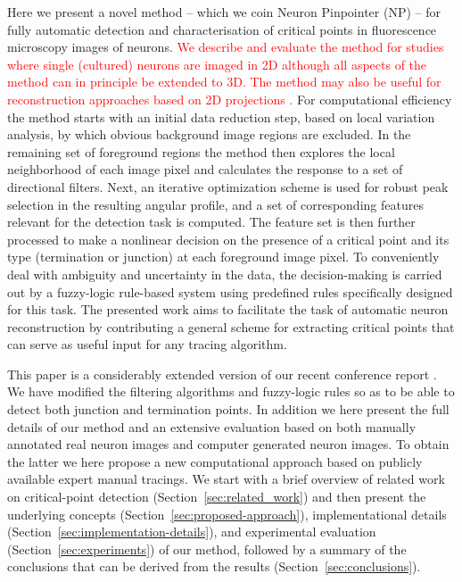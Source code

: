 \documentclass[twocolumn,natbib]{svjour3}
\newcommand{\marked}[1]{\textcolor{red}{#1}}
\begin{document}
Here we present a novel method -- which we coin Neuron Pinpointer (NP) -- for fully automatic detection and characterisation of critical points in fluorescence microscopy images of neurons. \marked{We describe and evaluate the method for studies where single (cultured) neurons are imaged in 2D although all aspects of the method can in principle be extended to 3D. The method may also be useful for reconstruction approaches based on 2D projections \citep{Zhou-2015}.} For computational efficiency the method starts with an initial data reduction step, based on local variation analysis, by which obvious background image regions are excluded. In the remaining set of foreground regions the method then explores the local neighborhood of each image pixel and calculates the response to a set of directional filters. Next, an iterative optimization scheme is used for robust peak selection in the resulting angular profile, and a set of corresponding features relevant for the detection task is computed. The feature set is then further processed to make a nonlinear decision on the presence of a critical point and its type (termination or junction) at each foreground image pixel. To conveniently deal with ambiguity and uncertainty in the data, the decision-making is carried out by a fuzzy-logic rule-based system using predefined rules specifically designed for this task. The presented work aims to facilitate the task of automatic neuron reconstruction by contributing a general scheme for extracting critical points that can serve as useful input for any tracing algorithm.

This paper is a considerably extended version of our recent conference report \citep{radojevic2014fuzzy}. We have modified the filtering algorithms and fuzzy-logic rules so as to be able to detect both junction and termination points. In addition we here present the full details of our method and an extensive evaluation based on both manually annotated real neuron images and computer generated neuron images. To obtain the latter we here propose a new computational approach based on publicly available expert manual tracings. We start with a brief overview of related work on critical-point detection (Section~\ref{sec:related_work}) and then present the underlying concepts (Section~\ref{sec:proposed-approach}), implementational details (Section~\ref{sec:implementation-details}), and experimental evaluation (Section~\ref{sec:experiments}) of our method, followed by a summary of the conclusions that can be derived from the results (Section~\ref{sec:conclusions}).
\end{document}
